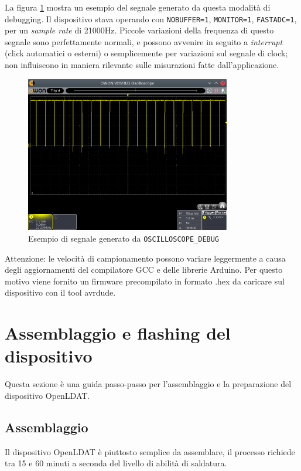 La figura \ref{fig:oscilloscopedebug} mostra un esempio del segnale generato da questa modalità di debugging. Il dispositivo stava operando con \texttt{NOBUFFER=1}, \texttt{MONITOR=1}, \texttt{FASTADC=1}, per un \textit{sample rate} di 21000Hz. Piccole variazioni della frequenza di questo segnale sono perfettamente normali, e possono avvenire in seguito a \textit{interrupt} (click automatici o esterni) o semplicemente per variazioni sul segnale di clock; non influiscono in maniera rilevante sulle misurazioni fatte dall'applicazione.

\begin{figure}[h]
	\centering
	\includegraphics[width=0.8\textwidth]{Dispositivo_files/scope.png}
	\caption{Esempio di segnale generato da \texttt{OSCILLOSCOPE\_DEBUG}}
	\label{fig:oscilloscopedebug}
\end{figure}

Attenzione: le velocità di campionamento possono variare leggermente a causa degli aggiornamenti del compilatore GCC e delle librerie Arduino. Per questo motivo viene fornito un firmware precompilato in formato .hex da caricare sul dispositivo con il tool avrdude.

\section{Assemblaggio e flashing del dispositivo}
Questa sezione è una guida passo-passo per l'assemblaggio e la preparazione del dispositivo OpenLDAT.

\subsection{Assemblaggio}
Il dispositivo OpenLDAT è piuttosto semplice da assemblare, il processo richiede tra 15 e 60 minuti a seconda del livello di abilità di saldatura.

